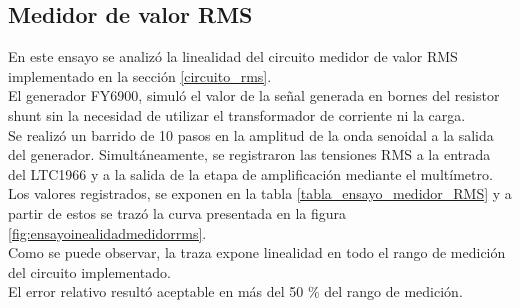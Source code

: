 \subsection{Medidor de valor RMS}\label{ensayo_medidor_rms}
En este ensayo se analiz\'{o} la linealidad del circuito medidor de valor RMS implementado en la secci\'{o}n \ref{circuito_rms}.\\
El generador FY6900, simul\'{o} el valor de la señal generada en bornes del resistor shunt sin la necesidad de utilizar el transformador de corriente ni la carga.\\
Se realiz\'{o} un barrido de 10 pasos en la amplitud de la onda senoidal a la salida del generador. Simultáneamente, se registraron las tensiones RMS a la entrada del LTC1966 y a la salida de la etapa de amplificaci\'{o}n mediante el mult\'{i}metro. Los valores registrados, se exponen en la tabla \ref{tabla_ensayo_medidor_RMS} y a partir de estos se traz\'{o} la curva presentada en la figura \ref{fig:ensayoinealidadmedidorrms}.\\
Como se puede observar, la traza expone linealidad en todo el rango de medición del circuito implementado.\\
El error relativo resultó aceptable en m\'{a}s del 50 \% del rango de medición.\\
